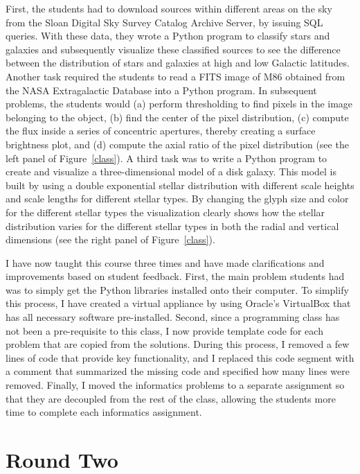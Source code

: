 \documentclass[11pt,twoside]{article}
\begin{document}
First, the students had to download sources within different areas on the sky from the Sloan Digital Sky Survey Catalog Archive Server, by issuing SQL queries. With these data, they wrote a Python program to classify stars and galaxies and subsequently visualize these classified sources to see the difference between the distribution of stars and galaxies at high and low Galactic latitudes. Another task required the students to read a FITS image of M86 obtained from the NASA Extragalactic Database into a Python program. In subsequent problems, the students would (a) perform thresholding to find pixels in the image belonging to the object, (b) find the center of the pixel distribution, (c) compute the flux inside a series of concentric apertures, thereby creating a surface brightness plot, and (d) compute the axial ratio of the pixel distribution (see the left panel of Figure~\ref{class}). A third task was to write a Python program to create and visualize a three-dimensional model of a disk galaxy. This model is built by using a double exponential stellar distribution with different scale heights and scale lengths for different stellar types. By changing the glyph size and color for the different stellar types the visualization clearly shows how the stellar distribution varies for the different stellar types in both the radial and vertical dimensions (see the right panel of Figure~\ref{class}).

I have now taught this course three times and have made clarifications and improvements based on student feedback. First, the main problem students had was to simply get the Python libraries installed onto their computer. To simplify this process, I have created a virtual appliance by using Oracle's VirtualBox that has all necessary software pre-installed. Second, since a programming class has not been a pre-requisite to this class, I now provide template code for each problem that are copied from the solutions. During this process, I removed a few lines of code that provide key functionality, and I replaced this code segment with a comment that summarized the missing code and specified how many lines were removed. Finally, I moved the informatics problems to a separate assignment so that they are decoupled from the rest of the class, allowing the students more time to complete each informatics assignment.

\section{Round Two~\label{r2}}
\end{document}
